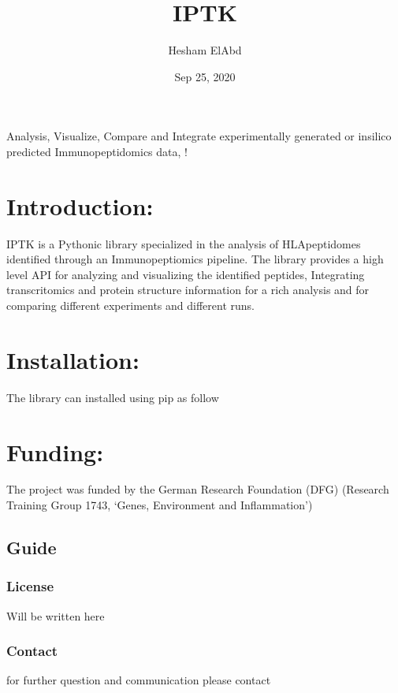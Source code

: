 \documentclass[letterpaper,10pt,english]{sphinxmanual}
\title{IPTK}
\date{Sep 25, 2020}
\author{Hesham ElAbd}
\begin{document}
\pagestyle{empty}
\sphinxmaketitle
\pagestyle{plain}
\sphinxtableofcontents
\pagestyle{normal}
\label{\detokenize{index::doc}}


\noindent{}

Analysis, Visualize, Compare and Integrate experimentally generated or in\sphinxhyphen{}silico predicted  Immunopeptidomics data,  !


\chapter{Introduction:}
\label{\detokenize{index:introduction}}
IPTK is a Pythonic library specialized in the analysis of HLA\sphinxhyphen{}peptidomes identified through an Immunopeptiomics pipeline.
The library provides a high level API for analyzing and visualizing the identified peptides,
Integrating transcritomics and protein structure information for a rich analysis and for comparing different experiments and different runs.


\chapter{Installation:}
\label{\detokenize{index:installation}}
The library can installed using pip as follow


\chapter{Funding:}
\label{\detokenize{index:funding}}
The project was funded by the German Research Foundation (DFG) (Research Training Group 1743, ‘Genes, Environment and Inflammation’)

\noindent{}


\section{Guide}
\label{\detokenize{index:guide}}

\subsection{License}
\label{\detokenize{license:license}}\label{\detokenize{license::doc}}
Will be written here


\subsection{Contact}
\label{\detokenize{license:contact}}
for further question and communication please contact 
\end{document}
